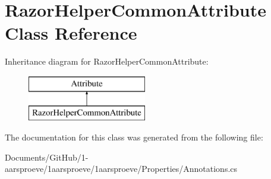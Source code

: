 \hypertarget{class_razor_helper_common_attribute}{}\section{Razor\+Helper\+Common\+Attribute Class Reference}
\label{class_razor_helper_common_attribute}
Inheritance diagram for Razor\+Helper\+Common\+Attribute\+:\begin{figure}[H]
\begin{center}
\leavevmode
\includegraphics[height=2.000000cm]{class_razor_helper_common_attribute}
\end{center}
\end{figure}


The documentation for this class was generated from the following file\+:\begin{DoxyCompactItemize}
\item 
Documents/\+Git\+Hub/1-\/aarsproeve/1aarsproeve/1aarsproeve/\+Properties/Annotations.\+cs\end{DoxyCompactItemize}
